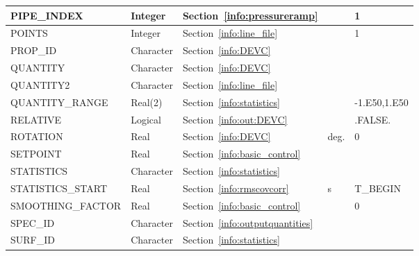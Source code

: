 \documentclass[11pt]{book}
\begin{document}
\begin{longtable}{@{\extracolsep{\fill}}|l|l|l|l|l|}
{\ct PIPE\_INDEX}           & Integer         & Section~\ref{info:pressureramp}                                 &       &  1            \\ \hline
{\ct POINTS}                & Integer         & Section~\ref{info:line_file}                                    &       & 1             \\ \hline
{\ct PROP\_ID}              & Character       & Section~\ref{info:DEVC}                                         &       &               \\ \hline
{\ct QUANTITY}              & Character       & Section~\ref{info:DEVC}                                         &       &               \\ \hline
{\ct QUANTITY2}             & Character       & Section~\ref{info:line_file}                                    &       &               \\ \hline
{\ct QUANTITY\_RANGE}       & Real(2)         & Section~\ref{info:statistics}                                   &       & -1.E50,1.E50  \\ \hline
{\ct RELATIVE}              & Logical         & Section~\ref{info:out:DEVC}                                     &       & {\ct .FALSE.} \\ \hline
{\ct ROTATION}              & Real            & Section~\ref{info:DEVC}                                         & deg.  & 0             \\ \hline
{\ct SETPOINT}              & Real            & Section~\ref{info:basic_control}                                &       &               \\ \hline
{\ct STATISTICS}            & Character       & Section~\ref{info:statistics}                                   &       &               \\ \hline
{\ct STATISTICS\_START}     & Real            & Section~\ref{info:rmscovcorr}                                   & s     & {\ct T\_BEGIN}\\ \hline
{\ct SMOOTHING\_FACTOR}     & Real            & Section~\ref{info:basic_control}                                &       & 0             \\ \hline
{\ct SPEC\_ID}              & Character       & Section~\ref{info:outputquantities}                             &       &               \\ \hline
{\ct SURF\_ID}              & Character       & Section~\ref{info:statistics}                                   &       &               \\ \hline

\end{longtable}
\end{document}
